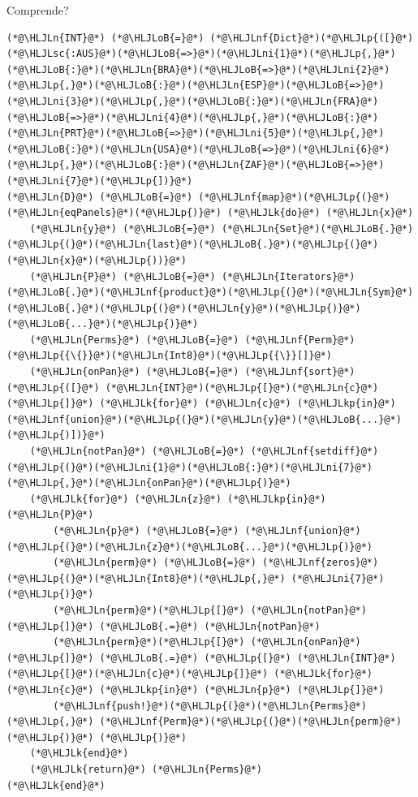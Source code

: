 \documentclass[12pt,a4paper]{article}
\newcommand{\HLJLk}[1]{\textcolor[RGB]{148,91,176}{\textbf{#1}}}
\newcommand{\HLJLkp}[1]{\textcolor[RGB]{148,91,176}{\textbf{#1}}}
\newcommand{\HLJLn}[1]{#1}
\newcommand{\HLJLnf}[1]{\textcolor[RGB]{66,102,213}{#1}}
\newcommand{\HLJLsc}[1]{\textcolor[RGB]{201,61,57}{#1}}
\newcommand{\HLJLni}[1]{\textcolor[RGB]{59,151,46}{#1}}
\newcommand{\HLJLoB}[1]{\textcolor[RGB]{102,102,102}{\textbf{#1}}}
\newcommand{\HLJLp}[1]{#1}
\begin{document}
Comprende?


\begin{lstlisting}
(*@\HLJLn{INT}@*) (*@\HLJLoB{=}@*) (*@\HLJLnf{Dict}@*)(*@\HLJLp{([}@*)(*@\HLJLsc{:AUS}@*)(*@\HLJLoB{=>}@*)(*@\HLJLni{1}@*)(*@\HLJLp{,}@*)(*@\HLJLoB{:}@*)(*@\HLJLn{BRA}@*)(*@\HLJLoB{=>}@*)(*@\HLJLni{2}@*)(*@\HLJLp{,}@*)(*@\HLJLoB{:}@*)(*@\HLJLn{ESP}@*)(*@\HLJLoB{=>}@*)(*@\HLJLni{3}@*)(*@\HLJLp{,}@*)(*@\HLJLoB{:}@*)(*@\HLJLn{FRA}@*)(*@\HLJLoB{=>}@*)(*@\HLJLni{4}@*)(*@\HLJLp{,}@*)(*@\HLJLoB{:}@*)(*@\HLJLn{PRT}@*)(*@\HLJLoB{=>}@*)(*@\HLJLni{5}@*)(*@\HLJLp{,}@*)(*@\HLJLoB{:}@*)(*@\HLJLn{USA}@*)(*@\HLJLoB{=>}@*)(*@\HLJLni{6}@*)(*@\HLJLp{,}@*)(*@\HLJLoB{:}@*)(*@\HLJLn{ZAF}@*)(*@\HLJLoB{=>}@*)(*@\HLJLni{7}@*)(*@\HLJLp{])}@*)
(*@\HLJLn{D}@*) (*@\HLJLoB{=}@*) (*@\HLJLnf{map}@*)(*@\HLJLp{(}@*)(*@\HLJLn{eqPanels}@*)(*@\HLJLp{)}@*) (*@\HLJLk{do}@*) (*@\HLJLn{x}@*)
	(*@\HLJLn{y}@*) (*@\HLJLoB{=}@*) (*@\HLJLn{Set}@*)(*@\HLJLoB{.}@*)(*@\HLJLp{(}@*)(*@\HLJLn{last}@*)(*@\HLJLoB{.}@*)(*@\HLJLp{(}@*)(*@\HLJLn{x}@*)(*@\HLJLp{))}@*)
	(*@\HLJLn{P}@*) (*@\HLJLoB{=}@*) (*@\HLJLn{Iterators}@*)(*@\HLJLoB{.}@*)(*@\HLJLnf{product}@*)(*@\HLJLp{(}@*)(*@\HLJLn{Sym}@*)(*@\HLJLoB{.}@*)(*@\HLJLp{(}@*)(*@\HLJLn{y}@*)(*@\HLJLp{)}@*)(*@\HLJLoB{...}@*)(*@\HLJLp{)}@*)
	(*@\HLJLn{Perms}@*) (*@\HLJLoB{=}@*) (*@\HLJLnf{Perm}@*)(*@\HLJLp{{\{}}@*)(*@\HLJLn{Int8}@*)(*@\HLJLp{{\}}[]}@*)
	(*@\HLJLn{onPan}@*) (*@\HLJLoB{=}@*) (*@\HLJLnf{sort}@*)(*@\HLJLp{([}@*) (*@\HLJLn{INT}@*)(*@\HLJLp{[}@*)(*@\HLJLn{c}@*)(*@\HLJLp{]}@*) (*@\HLJLk{for}@*) (*@\HLJLn{c}@*) (*@\HLJLkp{in}@*) (*@\HLJLnf{union}@*)(*@\HLJLp{(}@*)(*@\HLJLn{y}@*)(*@\HLJLoB{...}@*)(*@\HLJLp{)])}@*)
	(*@\HLJLn{notPan}@*) (*@\HLJLoB{=}@*) (*@\HLJLnf{setdiff}@*)(*@\HLJLp{(}@*)(*@\HLJLni{1}@*)(*@\HLJLoB{:}@*)(*@\HLJLni{7}@*)(*@\HLJLp{,}@*)(*@\HLJLn{onPan}@*)(*@\HLJLp{)}@*)
	(*@\HLJLk{for}@*) (*@\HLJLn{z}@*) (*@\HLJLkp{in}@*) (*@\HLJLn{P}@*)
		(*@\HLJLn{p}@*) (*@\HLJLoB{=}@*) (*@\HLJLnf{union}@*)(*@\HLJLp{(}@*)(*@\HLJLn{z}@*)(*@\HLJLoB{...}@*)(*@\HLJLp{)}@*)
		(*@\HLJLn{perm}@*) (*@\HLJLoB{=}@*) (*@\HLJLnf{zeros}@*)(*@\HLJLp{(}@*)(*@\HLJLn{Int8}@*)(*@\HLJLp{,}@*) (*@\HLJLni{7}@*)(*@\HLJLp{)}@*)
		(*@\HLJLn{perm}@*)(*@\HLJLp{[}@*) (*@\HLJLn{notPan}@*)(*@\HLJLp{]}@*) (*@\HLJLoB{.=}@*) (*@\HLJLn{notPan}@*)
		(*@\HLJLn{perm}@*)(*@\HLJLp{[}@*) (*@\HLJLn{onPan}@*) (*@\HLJLp{]}@*) (*@\HLJLoB{.=}@*) (*@\HLJLp{[}@*) (*@\HLJLn{INT}@*)(*@\HLJLp{[}@*)(*@\HLJLn{c}@*)(*@\HLJLp{]}@*) (*@\HLJLk{for}@*) (*@\HLJLn{c}@*) (*@\HLJLkp{in}@*) (*@\HLJLn{p}@*) (*@\HLJLp{]}@*)
		(*@\HLJLnf{push!}@*)(*@\HLJLp{(}@*)(*@\HLJLn{Perms}@*)(*@\HLJLp{,}@*) (*@\HLJLnf{Perm}@*)(*@\HLJLp{(}@*)(*@\HLJLn{perm}@*)(*@\HLJLp{)}@*) (*@\HLJLp{)}@*)
	(*@\HLJLk{end}@*)
	(*@\HLJLk{return}@*) (*@\HLJLn{Perms}@*)
(*@\HLJLk{end}@*)


\end{lstlisting}
\end{document}
